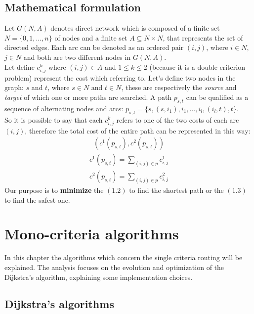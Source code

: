 \documentclass[a4paper,11pt]{report}
\begin{document}
 
\section{Mathematical formulation}

Let $G(N,A)$ denotes direct network which is composed of a finite set $N=\{0,1, \dots, n\}$ of nodes and a finite set $A \subseteq N\times N $, that represents the set of directed edges. Each arc can be denoted as an ordered pair $(i,j)$, where $i\in N$, $j \in N$ and both are two different nodes in $G(N,A)$.\\
Let define $c^k_{i,j}$ where $(i,j)\in A$ and $1\leq k \leq 2$ (because it is a double criterion problem) represent the cost which referring to. Let's define two nodes in the graph: $s$ and $t$, where $s \in N$ and $t \in N$, these are respectively the \textit{source} and \textit{target} of which one or more paths are searched.
A path $p_{s,t}$ can be qualified as a sequence  of  alternating nodes and arcs: $p_{s,t} = \{s, (s, i_1), i_1, \dots, i_{l}, (i_l,t), t\}$.\\
So it is possible to say that each $c^k_{i,j}$ refers to one of the two costs of each arc $(i,j)$, therefore the total cost of the entire path can be represented in this way:\\

\begin{gather}(c^1(p_{s,t}), c^2(p_{s,t}))\end{gather}
\begin{gather}c^1(p_{s,t})=\sum_{(i,j)\in p}c^1_{i,j}\end{gather}
\begin{gather}c^2(p_{s,t})=\sum_{(i,j)\in p}c^2_{i,j}\end{gather}
Our purpose is to \textbf{minimize} the $(1.2)$ to find the shortest path or the $(1.3)$ to find the safest one.

\chapter{Mono-criteria algorithms}

In this chapter the algorithms which concern the single criteria routing will be explained.
The analysis focuses on the evolution and optimization of the Dijkstra's algorithm, explaining some implementation choices.

\section{Dijkstra's algorithms}
\end{document}
